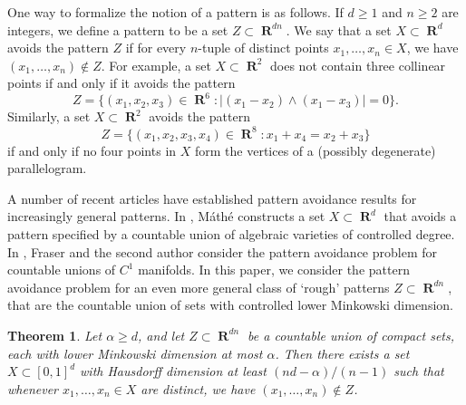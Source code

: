 \documentclass[dvipsnames,letterpaper,12pt]{article}
\numberwithin{equation}{section}
\theoremstyle{plain}
\newtheorem{theorem}{Theorem}
\theoremstyle{remark}
\DeclareMathOperator{\RR}{\mathbf{R}}
\DeclareMathOperator{\setcolon}{\colon}
\begin{document}
One way to formalize the notion of a pattern is as follows. If $d \geq 1$ and $n \geq 2$ are integers, we define a pattern to be a set $Z \subset \RR^{dn}$. We say that a set $X \subset \RR^d$ avoids the pattern $Z$ if for every $n$-tuple of distinct points $x_1, \ldots, x_n\in X$, we have $(x_1,\ldots,x_n) \not \in Z$. For example, a set $X \subset \RR^2$ does not contain three collinear points if and only if it avoids the pattern
%
\[ Z = \{ (x_1,x_2,x_3) \in \RR^{6} \setcolon |(x_1-x_2)\wedge (x_1-x_3)|=0\}. \]
%
Similarly, a set $X \subset \RR^2$ avoids the pattern
%
\[ Z = \{ (x_1, x_2,x_3,x_4) \in \RR^8 \setcolon x_1 + x_4 = x_2 + x_3 \} \]
%
if and only if no four points in $X$ form the vertices of a (possibly degenerate) parallelogram.

A number of recent articles have established pattern avoidance results for increasingly general patterns. In \cite{Mathe}, M\'{a}th\'{e} constructs a set $X\subset\RR^d$ that avoids a pattern specified by a countable union of algebraic varieties of controlled degree. In \cite{MalabikaRob}, Fraser and the second author consider the pattern avoidance problem for countable unions of $C^1$ manifolds. In this paper, we consider the pattern avoidance problem for an even more general class of `rough' patterns $Z \subset \RR^{dn}$, that are the countable union of sets with controlled lower Minkowski dimension.
%

\begin{theorem}\label{mainTheorem}
	Let $\alpha \geq d$, and let $Z \subset \RR^{dn}$ be a countable union of compact sets, each with lower Minkowski dimension at most $\alpha$. Then there exists a set $X \subset [0,1]^d$ with Hausdorff dimension at least $(nd - \alpha)/(n-1)$ such that whenever $x_1, \dots, x_n \in X$ are distinct, we have $(x_1, \dots, x_n) \not \in Z$.
\end{theorem}
\end{document}
